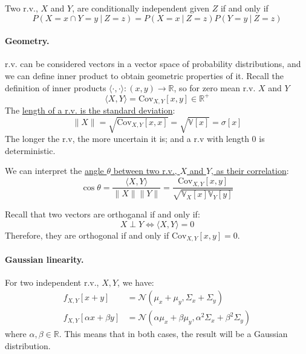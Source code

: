 \documentclass{article}
\begin{document}
\begin{definition}
    Two r.v., $X$ and $Y$, are conditionally independent given $Z$ if and only
    if 
    $$P(X=x\cap Y=y\ |\ Z=z)=P(X=x\ |\ Z=z)P(Y=y\ |\ Z=z)$$
\end{definition}
\paragraph{Geometry.}r.v. can be considered vectors in a vector space of
probability distributions, and we can define inner product to obtain geometric
properties of it. Recall the definition of inner products
$\langle\cdot,\cdot\rangle:(x,y)\to \mathbb{R}$, so for zero mean r.v. $X$ and
$Y$
$$\langle X,Y\rangle=\text{Cov}_{X,Y}[x,y]\in \mathbb{R}^+$$
The \underline{length of a r.v. is the standard deviation}:
$$\lVert X\rVert=\sqrt{\text{Cov}_{X,Y}[x,x]}=\sqrt{\mathbb{V}[x]}=\sigma[x]$$
The longer the r.v, the more uncertain it is; and a r.v with length 0 is
deterministic.

We can interpret the \underline{angle $\theta$ between two r.v., $X$ and $Y$,
as their correlation}:
$$\cos\theta=\frac{\langle X,Y\rangle}{\lVert X\rVert \lVert
Y\rVert}=\frac{\text{Cov}_{X,Y}[x,y]}{\sqrt{\mathbb{V}_X[x]\mathbb{V}_Y[y]}}$$

Recall that two vectors are orthoganal if and only if:
$$X\perp Y\iff\langle X,Y\rangle=0$$
Therefore, they are orthogonal if and only if $\text{Cov}_{X,Y}[x,y]=0$.
\paragraph{Gaussian linearity.}
For two independent r.v., $X,Y$, we have:
$$
\begin{aligned}
    f_{X,Y}[x+y]&=\mathcal{N}(\mu_x+\mu_y,\Sigma_x+\Sigma_y) \\
    f_{X,Y}[\alpha x+\beta y]&=\mathcal{N}(\alpha\mu_x+\beta\mu_y,\alpha^2\Sigma_x+\beta^2\Sigma_y) 
\end{aligned}
$$
where $\alpha,\beta\in \mathbb{R}$. This means that in both cases, the result
will be a Gaussian distribution.
\cleardoublepage
\end{document}
